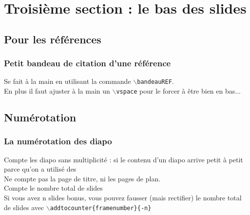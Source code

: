 \section{Troisième section : le bas des slides}
\subsection{Pour les références}
\begin{frame}[fragile]
\frametitle{Petit bandeau de citation d'une référence\esp}

Se fait à la main en utilisant la commande \texttt{$\backslash$bandeauREF}.\\
En plus il faut ajuster à la main un  \texttt{$\backslash$vspace} pour le forcer à être bien en bas...\\
\vspace*{5.2cm}
\end{frame}







\subsection{Numérotation}
\begin{frame}[fragile]
\frametitle{La numérotation des diapo\esp}
Compte les diapo sans multiplicité : si le contenu d'un diapo arrive petit à petit parce qu'on a utilisé des %
\\[1cm]
Ne compte pas la page de titre, ni les pages de plan. \\[1cm]
Compte le nombre total de slides\\[1cm]
Si vous avez n slides bonus, vous pouvez fausser (mais rectifier) 
le nombre total de slides avec  \texttt{$\backslash$addtocounter\{framenumber\}\{-n\} } 
\end{frame}


